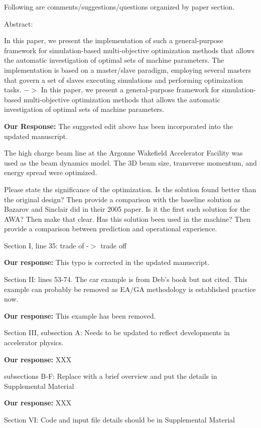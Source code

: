 \documentclass{article}
\begin{document}
Following are comments/suggestions/questions organized by paper
section.

Abstract:

In this paper, we present the implementation of such a general-purpose
framework for simulation-based multi-objective optimization methods
that allows the automatic investigation of optimal sets of machine
parameters. The implementation is based on a master/slave paradigm,
employing several masters that govern a set of slaves executing
simulations and performing optimization tasks. $->$ In this paper, we
present a general-purpose framework for simulation-based
multi-objective optimization methods that allows the automatic
investigation of optimal sets of machine parameters.

{\bf Our Response:} {\color{blue} The suggested edit above has been incorporated into the updated manuscript. }

The high charge beam line at the Argonne Wakefield Accelerator
Facility was used as the beam dynamics model. The 3D beam size,
transverse momentum, and energy spread were optimized. 

Please state
the significance of the optimization. Is the solution found better
than the original design? Then provide a comparison with the baseline
solution as Bazarov and Sinclair did in their 2005 paper. Is it the
first such solution for the AWA? Then make that clear. Has this
solution been used in the machine? Then provide a comparison between
prediction and operational experience.

Section I, line 35: trade of -$>$ trade off

{\bf Our response:} {\color{blue} This typo is corrected in the updated manuscript.}

Section II:
lines 53-74. The car example is from Deb’s book but not cited. This
example can probably be removed as EA/GA methodology is established
practice now.

{\bf Our response:} {\color{blue} This example has been removed.}

Section III, subsection A:
Needs to be updated to reflect developments in accelerator physics.

{\bf Our response:} {\color{blue} XXX}

subsections B-F:
Replace with a brief overview and put the details in Supplemental
Material

{\bf Our response: } {\color{blue} XXX}

Section VI: 
Code and input file details should be in Supplemental Material
\end{document}
